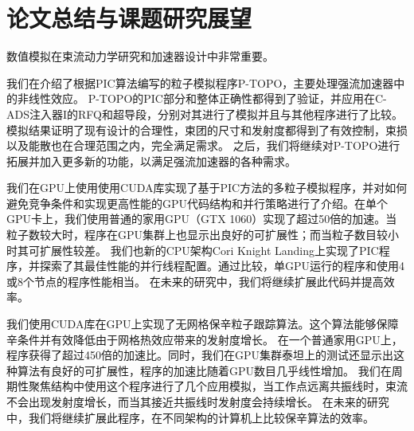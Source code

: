 
\chapter{论文总结与课题研究展望}
\label{chap:conclusion}

数值模拟在束流动力学研究和加速器设计中非常重要。


我们在介绍了根据PIC算法编写的粒子模拟程序P-TOPO，主要处理强流加速器中的非线性效应。
P-TOPO的PIC部分和整体正确性都得到了验证，并应用在C-ADS注入器I的RFQ和超导段，分别对其进行了模拟并且与其他程序进行了比较。
模拟结果证明了现有设计的合理性，束团的尺寸和发射度都得到了有效控制，束损以及能散也在合理范围之内，完全满足需求。
之后，我们将继续对P-TOPO进行拓展并加入更多新的功能，以满足强流加速器的各种需求。

我们在GPU上使用使用CUDA库实现了基于PIC方法的多粒子模拟程序，并对如何避免竞争条件和实现更高性能的GPU代码结构和并行策略进行了介绍。在单个GPU卡上，我们使用普通的家用GPU（GTX 1060）实现了超过50倍的加速。当粒子数较大时，程序在GPU集群上也显示出良好的可扩展性；而当粒子数目较小时其可扩展性较差。
我们也新的CPU架构Cori Knight Landing上实现了PIC程序，并探索了其最佳性能的并行线程配置。通过比较，单GPU运行的程序和使用4或8个节点的程序性能相当。
在未来的研究中，我们将继续扩展此代码并提高效率。

我们使用CUDA库在GPU上实现了无网格保辛粒子跟踪算法。这个算法能够保障辛条件并有效降低由于网格热效应带来的发射度增长。
在一个普通家用GPU上，程序获得了超过450倍的加速比。同时，我们在GPU集群泰坦上的测试还显示出这种算法有良好的可扩展性，程序的加速比随着GPU数目几乎线性增加。
我们在周期性聚焦结构中使用这个程序进行了几个应用模拟，当工作点远离共振线时，束流不会出现发射度增长，而当其接近共振线时发射度会持续增长。
在未来的研究中，我们将继续扩展此程序，在不同架构的计算机上比较保辛算法的效率。